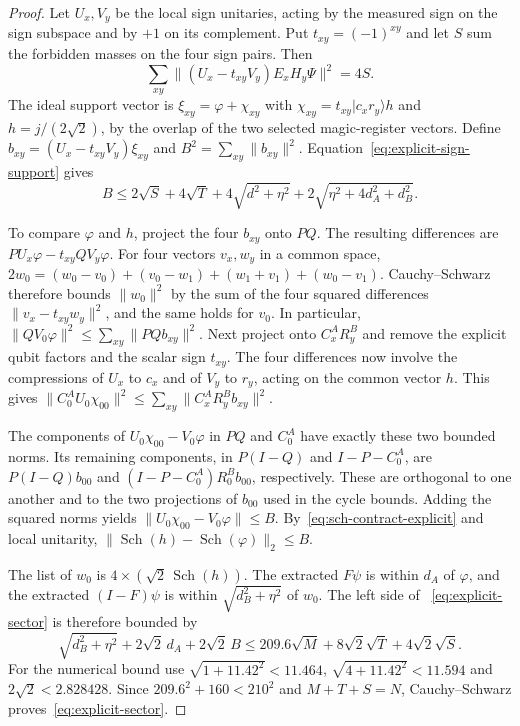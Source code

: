 \begin{proof}
Let $U_x,V_y$ be the local sign unitaries, acting by the measured sign
on the sign subspace and by $+1$ on its complement. Put
$t_{xy}=(-1)^{xy}$ and let $S$ sum the forbidden masses on the four
sign pairs. Then
\[
 \sum_{xy}\|(U_x-t_{xy}V_y)E_xH_y\Psi\|^2=4S.
\]
The ideal support vector is $\xi_{xy}=\varphi+\chi_{xy}$ with
$\chi_{xy}=t_{xy}|c_xr_y\rangle h$ and $h=j/(2\sqrt2)$, by the
overlap of the two selected magic-register vectors. Define
$b_{xy}=(U_x-t_{xy}V_y)\xi_{xy}$ and $B^2=\sum_{xy}\|b_{xy}\|^2$.
Equation~\eqref{eq:explicit-sign-support} gives
\[
 B\le 2\sqrt S+4\sqrt T+4\sqrt{d^2+\eta^2}
                 +2\sqrt{\eta^2+4d_A^2+d_B^2}.
\]

To compare $\varphi$ and $h$, project the four $b_{xy}$ onto $PQ$.
The resulting differences are $P U_x\varphi-t_{xy}Q V_y\varphi$.
For four vectors $v_x,w_y$ in a common space,
$2w_0=(w_0-v_0)+(v_0-w_1)+(w_1+v_1)+(w_0-v_1)$.
Cauchy--Schwarz therefore bounds $\|w_0\|^2$ by the sum of the four
squared differences $\|v_x-t_{xy}w_y\|^2$, and the same holds for
$v_0$. In particular,
$\|Q V_0\varphi\|^2\le\sum_{xy}\|PQ b_{xy}\|^2$.
Next project onto $C_x^A R_y^B$ and remove the explicit qubit factors
and the scalar sign $t_{xy}$. The four differences now involve the
compressions of $U_x$ to $c_x$ and of $V_y$ to $r_y$, acting on the
common vector $h$. This gives
$\|C_0^A U_0\chi_{00}\|^2\le\sum_{xy}\|C_x^A R_y^B b_{xy}\|^2$.

The components of $U_0\chi_{00}-V_0\varphi$ in $PQ$ and $C_0^A$
have exactly these two bounded norms. Its remaining components, in
$P(I-Q)$ and $I-P-C_0^A$, are
$P(I-Q)b_{00}$ and $(I-P-C_0^A)R_0^B b_{00}$, respectively.
These are orthogonal to one another and to the two projections
of $b_{00}$ used in the cycle bounds. Adding the squared norms yields
$\|U_0\chi_{00}-V_0\varphi\|\le B$.
By~\eqref{eq:sch-contract-explicit} and local unitarity,
$\|\operatorname{Sch}(h)-\operatorname{Sch}(\varphi)\|_2\le B$.

The list of $w_0$ is $4\times(\sqrt2\,\operatorname{Sch}(h))$.
The extracted $F\psi$ is within $d_A$ of $\varphi$, and the extracted
$(I-F)\psi$ is within $\sqrt{d_B^2+\eta^2}$ of $w_0$. The left side of
~\eqref{eq:explicit-sector} is therefore bounded by
\[
 \sqrt{d_B^2+\eta^2}+2\sqrt2\,d_A+2\sqrt2\,B
 \le 209.6\sqrt M+8\sqrt2\sqrt T+4\sqrt2\sqrt S .
\]
For the numerical bound use
$\sqrt{1+11.42^2}<11.464$, $\sqrt{4+11.42^2}<11.594$ and
$2\sqrt2<2.828428$. Since $209.6^2+160<210^2$ and $M+T+S=N$,
Cauchy--Schwarz proves~\eqref{eq:explicit-sector}.
\end{proof}

